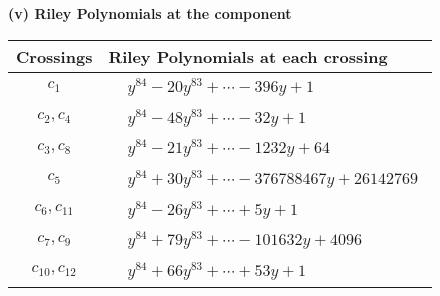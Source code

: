 \documentclass[1p]{elsarticle_modified}
\theoremstyle{definition}
\begin{document}
\flushleft \textbf{(v) Riley Polynomials at the component}\newline \\
\begin{tabular}{m{50pt}|m{274pt}}
Crossings & \hspace{64pt}Riley Polynomials at each crossing \\
\hline $$\begin{aligned}c_{1}\end{aligned}$$&$\begin{aligned}
&y^{84}-20 y^{83}+\cdots-396 y+1
\end{aligned}$\\
\hline $$\begin{aligned}c_{2},c_{4}\end{aligned}$$&$\begin{aligned}
&y^{84}-48 y^{83}+\cdots-32 y+1
\end{aligned}$\\
\hline $$\begin{aligned}c_{3},c_{8}\end{aligned}$$&$\begin{aligned}
&y^{84}-21 y^{83}+\cdots-1232 y+64
\end{aligned}$\\
\hline $$\begin{aligned}c_{5}\end{aligned}$$&$\begin{aligned}
&y^{84}+30 y^{83}+\cdots-376788467 y+26142769
\end{aligned}$\\
\hline $$\begin{aligned}c_{6},c_{11}\end{aligned}$$&$\begin{aligned}
&y^{84}-26 y^{83}+\cdots+5 y+1
\end{aligned}$\\
\hline $$\begin{aligned}c_{7},c_{9}\end{aligned}$$&$\begin{aligned}
&y^{84}+79 y^{83}+\cdots-101632 y+4096
\end{aligned}$\\
\hline $$\begin{aligned}c_{10},c_{12}\end{aligned}$$&$\begin{aligned}
&y^{84}+66 y^{83}+\cdots+53 y+1
\end{aligned}$\\
\hline
\end{tabular}\\~\\
\end{document}
